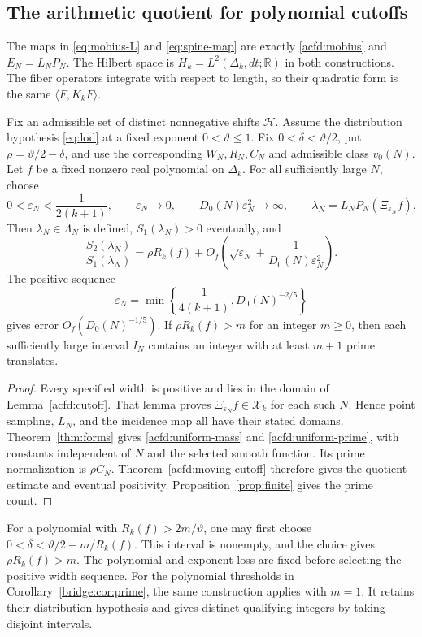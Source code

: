 \subsection{The arithmetic quotient for polynomial cutoffs}
\label{acfd:native-consumer}

The maps in \eqref{eq:mobius-L} and \eqref{eq:spine-map} are exactly
\eqref{acfd:mobius} and $E_N=L_NP_N$.
The Hilbert space is $H_k=L^2(\Delta_k,dt;\mathbb R)$ in both constructions.
The fiber operators integrate with respect to length, so their quadratic
form is the same $\langle F,K_kF\rangle$.

\begin{corollary}
\label{acfd:native-polynomial}
Fix an admissible set of distinct nonnegative shifts $\mathcal H$.
Assume the distribution hypothesis \eqref{eq:lod} at a fixed exponent
$0<\vartheta\leq1$.
Fix $0<\delta<\vartheta/2$, put $\rho=\vartheta/2-\delta$, and use
the corresponding $W_N,R_N,C_N$ and admissible class $v_0(N)$.
Let $f$ be a fixed nonzero real polynomial on $\Delta_k$.
For all sufficiently large $N$, choose
\[
 0<\varepsilon_N<\frac1{2(k+1)},\qquad
 \varepsilon_N\longrightarrow0,\qquad
 D_0(N)\varepsilon_N^2\longrightarrow\infty,
 \qquad \lambda_N=L_NP_N(\Xi_{\varepsilon_N}f).
\]
Then $\lambda_N\in\Lambda_N$ is defined, $S_1(\lambda_N)>0$ eventually,
and
\[
 \frac{S_2(\lambda_N)}{S_1(\lambda_N)}
 =\rho R_k(f)+
 O_f\left(\sqrt{\varepsilon_N}+\frac1{D_0(N)\varepsilon_N^2}\right).
\]
The positive sequence
\[
 \varepsilon_N=\min\left\{\frac1{4(k+1)},D_0(N)^{-2/5}\right\}
\]
gives error $O_f(D_0(N)^{-1/5})$.
If $\rho R_k(f)>m$ for an integer $m\geq0$, then each sufficiently
large interval $I_N$ contains an integer with at least $m+1$ prime translates.
\end{corollary}

\begin{proof}
Every specified width is positive and lies in the domain of
Lemma~\ref{acfd:cutoff}.
That lemma proves $\Xi_{\varepsilon_N}f\in\mathcal X_k$ for each such $N$.
Hence point sampling, $L_N$, and the incidence map all have their stated domains.
Theorem~\ref{thm:forms} gives \eqref{acfd:uniform-mass} and
\eqref{acfd:uniform-prime}, with constants independent of $N$ and the
selected smooth function.  Its prime normalization is $\rho C_N$.
Theorem~\ref{acfd:moving-cutoff} therefore gives the quotient estimate
and eventual positivity.  Proposition~\ref{prop:finite} gives the prime count.
\end{proof}

For a polynomial with $R_k(f)>2m/\vartheta$, one may first choose
$0<\delta<\vartheta/2-m/R_k(f)$.
This interval is nonempty, and the choice gives $\rho R_k(f)>m$.
The polynomial and exponent loss are fixed before selecting the positive
width sequence.  For the polynomial thresholds in
Corollary~\ref{bridge:cor:prime}, the same construction applies with $m=1$.
It retains their distribution hypothesis and gives distinct qualifying
integers by taking disjoint intervals.
